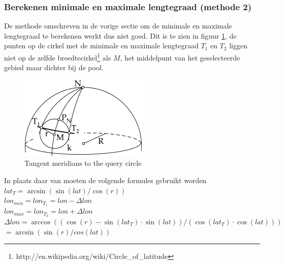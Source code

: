 \documentclass[twoside,openright]{uva-bachelor-thesis}
\begin{document}
		\subsubsection{Berekenen minimale en maximale lengtegraad (methode 2)}
		De methode omschreven in de vorige sectie om de minimale en maximale lengtegraad te berekenen werkt dus niet goed. Dit is te zien in figuur \ref{fig:tangentpoints}, de punten op de cirkel met de minimale en maximale lengtegraad $T_1$ en $T_2$ liggen niet op de zelfde breedtecirkel\footnote{http://en.wikipedia.org/wiki/Circle\_of\_latitude} als $M$, het middelpunt van het geselecteerde gebied maar dichter bij de pool.
		\begin{figure}[!htb]
			\centering
			\includegraphics[scale=1.0]{./img/TangentPoints.png}
			\caption{Tangent meridians to the query circle}
			\label{fig:tangentpoints}
		\end{figure}
		\newpage
		In plaats daar van moeten de volgende formules gebruikt worden
		\\[0.5cm]
		$lat_T = \arcsin(\sin(lat)/\cos(r))$\\
		$lon_{min} = lon_{T_1} = lon - \Delta lon$\\
		$lon_{max} = lon_{T_2} = lon + \Delta lon$
		\\[0.5cm]
		$\Delta lon = \arccos((\cos(r) - \sin(lat_T) \cdot \sin(lat)) / (\cos(lat_T) \cdot \cos(lat)))$ \\
		$= \arcsin(\sin(r) / cos(lat))$
\end{document}
